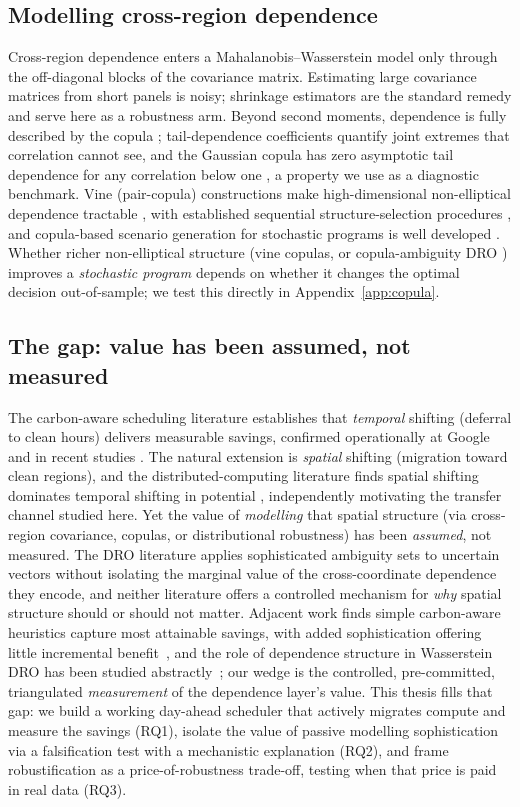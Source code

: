 \documentclass[12pt]{article}
\begin{document}
\subsection{Modelling cross-region dependence}
Cross-region dependence enters a Mahalanobis--Wasserstein model only through the
off-diagonal blocks of the covariance matrix. Estimating large covariance matrices
from short panels is noisy; shrinkage estimators \citep{ledoit2004} are the standard
remedy and serve here as a robustness arm. Beyond second moments, dependence is
fully described by the copula \citep{sklar1959,joe2014}; tail-dependence
coefficients quantify joint extremes that correlation cannot see, and the Gaussian
copula has zero asymptotic tail dependence for any correlation below one
\citep{embrechts2002}, a property we use as a diagnostic benchmark.
Vine (pair-copula) constructions make high-dimensional non-elliptical dependence
tractable \citep{aas2009,joe2014,czado2019}, with established sequential
structure-selection procedures \citep{dissmann2013}, and copula-based scenario
generation for stochastic programs is well developed \citep{kaut2014}. Whether richer
non-elliptical structure (vine copulas, or copula-ambiguity DRO \citep{fan2024})
improves a \emph{stochastic program} depends on whether it changes the optimal decision
out-of-sample; we test this directly in Appendix~\ref{app:copula}.

\subsection{The gap: value has been assumed, not measured}
The carbon-aware scheduling literature establishes that \emph{temporal} shifting
(deferral to clean hours) delivers measurable savings, confirmed operationally at
Google and in recent studies \citep{radovanovic2023,wiesner2021}. The natural extension
is \emph{spatial} shifting (migration toward clean regions), and the
distributed-computing literature finds spatial shifting dominates temporal shifting in
potential \citep{wiesner2021}, independently motivating the transfer channel studied
here. Yet the value of \emph{modelling} that spatial structure (via cross-region covariance,
copulas, or distributional robustness) has been \emph{assumed}, not measured. The DRO
literature applies sophisticated ambiguity sets to uncertain vectors without isolating
the marginal value of the cross-coordinate dependence they encode, and neither
literature offers a controlled mechanism for \emph{why} spatial structure should or
should not matter. Adjacent work finds simple carbon-aware heuristics capture most
attainable savings, with added sophistication offering little incremental
benefit~\citep{bostandoost2024}, and the role of dependence structure in Wasserstein
DRO has been studied abstractly~\citep{gao2017}; our wedge is the controlled,
pre-committed, triangulated \emph{measurement} of the dependence layer's value. This
thesis fills that gap: we build a working day-ahead scheduler that actively migrates
compute and measure the savings (RQ1), isolate the value of passive modelling
sophistication via a falsification test with a mechanistic explanation (RQ2), and frame
robustification as a price-of-robustness trade-off, testing when that price is paid in
real data (RQ3).
\end{document}
